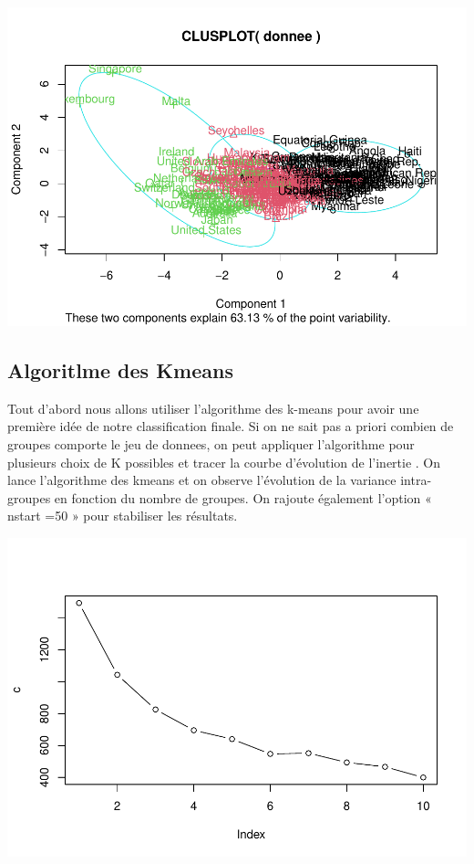 \documentclass[
]{article}
\begin{document}
\includegraphics{Projet_files/figure-latex/unnamed-chunk-22-1.pdf}

\hypertarget{algoritlme-des-kmeans}{%
\subsection{Algoritlme des Kmeans}\label{algoritlme-des-kmeans}}

Tout d'abord nous allons utiliser l'algorithme des k-means pour avoir
une première idée de notre classification finale. Si on ne sait pas a
priori combien de groupes comporte le jeu de donnees, on peut appliquer
l'algorithme pour plusieurs choix de K possibles et tracer la courbe
d'évolution de l'inertie . On lance l'algorithme des kmeans et on
observe l'évolution de la variance intra-groupes en fonction du nombre
de groupes. On rajoute également l'option « nstart =50 » pour stabiliser
les résultats.

\includegraphics{Projet_files/figure-latex/unnamed-chunk-23-1.pdf}
\end{document}
